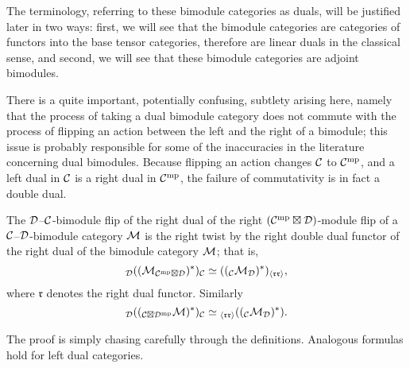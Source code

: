 \documentclass{amsart}
\begin{document}
\noindent The terminology, referring to these bimodule categories as duals, will be justified later in two ways: first, we will see that the bimodule categories are categories of functors into the base tensor categories, therefore are linear duals in the classical sense, and second, we will see that these bimodule categories are adjoint bimodules.  

There is a quite important, potentially confusing, subtlety arising here, namely that the process of taking a dual bimodule category does not commute with the process of flipping an action between the left and the right of a bimodule; this issue is probably responsible for some of the inaccuracies in the literature concerning dual bimodules.  Because flipping an action changes $\mathcal C$ to $\mathcal C^{\mathrm{mp}}$, and a left dual in $\mathcal C$ is a right dual in $\mathcal C^{\mathrm{mp}}$, the failure of commutativity is in fact a double dual.
\begin{lemma} \label{lemma:DualTwist}
The $\mathcal D$--$\mathcal C$-bimodule flip of the right dual of the right $(\mathcal C^{\mathrm{mp}} \boxtimes \mathcal D)$-module flip of a $\mathcal C$--$\mathcal D$-bimodule category $\mathcal M$ is the right twist by the right double dual functor of the right dual of the bimodule category $\mathcal M$; that is,
\[
{}_\mathcal D ((\mathcal M_{\mathcal C^{\mathrm{mp}} \boxtimes \mathcal D})^*)_\mathcal C \simeq (({}_\mathcal C \mathcal M_\mathcal D)^*)_{\langle \mathfrak{r r} \rangle},
\]
where $\mathfrak{r}$ denotes the right dual functor.  Similarly
\[
{}_\mathcal D (({}_{\mathcal C \boxtimes \mathcal D^{\mathrm{mp}}}\mathcal M)^*)_\mathcal C \simeq {}_{\langle \mathfrak{r r} \rangle}(({}_\mathcal C \mathcal M_\mathcal D)^*).
\]

\end{lemma}
\noindent The proof is simply chasing carefully through the definitions.  Analogous formulas hold for left dual categories.
\end{document}
